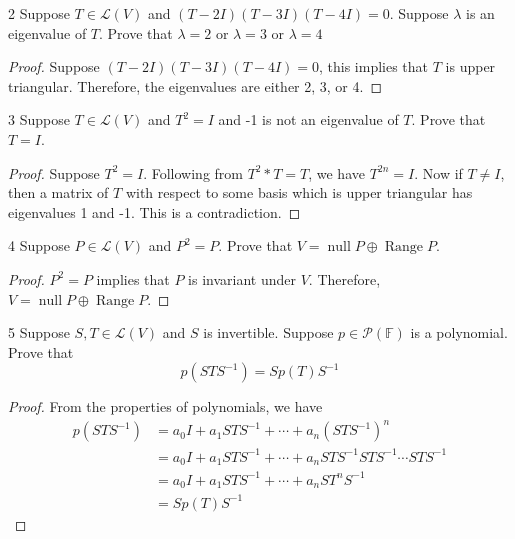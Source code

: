 \documentclass{article}
\newenvironment{problem}[1]{\begin{prob*}{#1}{}}{\end{prob*}}
\DeclareMathOperator{\Null}{null}
\begin{document}
\begin{problem}{2}
Suppose $T \in \mathcal{L}(V)$ and $(T-2I)(T-3I)(T-4I) = 0$. Suppose $\lambda$ is an eigenvalue of $T$. Prove that $\lambda = 2$ or $\lambda = 3$ or $\lambda = 4$
\end{problem}
\begin{proof}
	Suppose $(T-2I)(T-3I)(T-4I) = 0$, this implies that $T$ is upper triangular. Therefore, the eigenvalues are either 2, 3, or 4.
\end{proof}

\begin{problem}{3}
Suppose $T \in \mathcal{L}(V)$ and $T^{2} = I$ and -1 is not an eigenvalue of $T$. Prove that $T = I$.
\end{problem}
\begin{proof}
	Suppose $T^{2} = I$. Following from $T^{2}* T = T$, we have $T^{2n} = I$. Now if $T \neq I$, then a matrix of $T$ with respect to some basis which is upper triangular has eigenvalues 1 and -1. This is a contradiction.
\end{proof}

\begin{problem}{4}
Suppose $P \in \mathcal{L}(V)$ and $P^{2} = P$. Prove that $V = \Null P \oplus \operatorname{Range} P$.
\end{problem}
\begin{proof}
	$P^{2} = P$ implies that $P$ is invariant under $V$. Therefore, $V = \Null P \oplus \operatorname{Range} P$.
\end{proof}

\begin{problem}{5}
Suppose $S,T \in \mathcal{L}(V)$ and $S$ is
invertible. Suppose $p \in \mathcal{P}(\mathbb{F})$
is a polynomial. Prove that\[
	p(STS^{-1}) = Sp(T)S^{-1}\]
\end{problem}
\begin{proof}
	From the properties of polynomials, we have
	\begin{equation*}
		\begin{aligned}
			p(STS^{-1}) & = a_0I + a_1STS^{-1} + \cdots + a_n(STS^{-1})^{n}                   \\
			            & = a_0I + a_1STS^{-1} + \cdots + a_nSTS^{-1}STS^{-1} \cdots STS^{-1} \\
			            & = a_0I + a_1STS^{-1} + \cdots + a_nST^{n}S^{-1}                     \\
			            & = Sp(T)S^{-1}
		\end{aligned}
	\end{equation*}
\end{proof}
\end{document}
